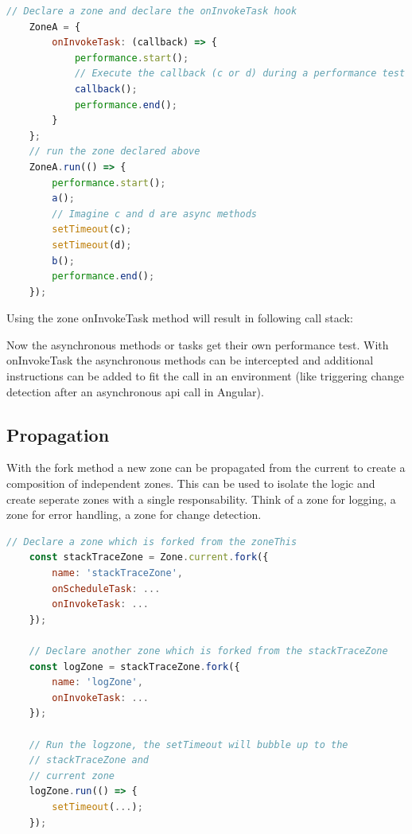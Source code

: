 \begin{lstlisting}[language=Javascript]
	// Declare a zone and declare the onInvokeTask hook
	ZoneA = {
		onInvokeTask: (callback) => {
			performance.start();
			// Execute the callback (c or d) during a performance test
			callback();
			performance.end();
		}	
	};
	// run the zone declared above
	ZoneA.run(() => {
		performance.start();
		a();
		// Imagine c and d are async methods
		setTimeout(c);
		setTimeout(d);
		b();
		performance.end();
	});
\end{lstlisting}

Using the zone onInvokeTask method will result in following call stack:


Now the asynchronous methods or tasks get their own performance test.
With onInvokeTask the asynchronous methods can be intercepted and additional instructions can be added to fit the call in an environment (like triggering change detection after an asynchronous api call in Angular).

\subsection{Propagation}
With the fork method a new zone can be propagated from the current to create a composition of independent zones. This can be used to isolate the logic and create seperate zones with a single responsability. Think of a zone for logging, a zone for error handling, a zone for change detection.

\begin{lstlisting}[language=Javascript]
	// Declare a zone which is forked from the zoneThis
	const stackTraceZone = Zone.current.fork({
		name: 'stackTraceZone',
		onScheduleTask: ...
		onInvokeTask: ...
	});

	// Declare another zone which is forked from the stackTraceZone
	const logZone = stackTraceZone.fork({
		name: 'logZone',
		onInvokeTask: ...
	});
	
	// Run the logzone, the setTimeout will bubble up to the 
	// stackTraceZone and
	// current zone
	logZone.run(() => {
		setTimeout(...);
	});
\end{lstlisting}

